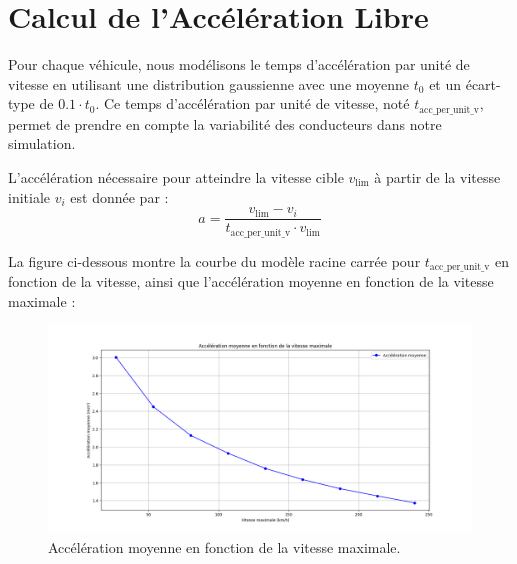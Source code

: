 \documentclass{article}
\begin{document}
\section{Calcul de l'Accélération Libre}
Pour chaque véhicule, nous modélisons le temps d'accélération par unité de vitesse en utilisant une distribution gaussienne avec une moyenne \(t_0\) et un écart-type de \(0.1 \cdot t_0\). Ce temps d'accélération par unité de vitesse, noté \(t_{\text{acc\_per\_unit\_v}}\), permet de prendre en compte la variabilité des conducteurs dans notre simulation.

L'accélération nécessaire pour atteindre la vitesse cible \(v_{\text{lim}}\) à partir de la vitesse initiale \(v_i\) est donnée par :
\[
a = \frac{v_{\text{lim}} - v_i}{t_{\text{acc\_per\_unit\_v}} \cdot v_{\text{lim}}}
\]


La figure ci-dessous montre la courbe du modèle racine carrée pour \(t_{\text{acc\_per\_unit\_v}}\) en fonction de la vitesse, ainsi que l'accélération moyenne en fonction de la vitesse maximale :

\begin{figure}[h!]
    \centering
    \includegraphics[width=\textwidth]{Free acceleration.png}
    \caption{Accélération moyenne en fonction de la vitesse maximale.}
    \label{fig:free_acceleration}
\end{figure}
\end{document}
